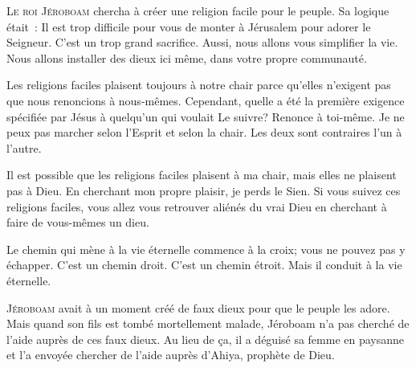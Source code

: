 \lettrine{L}{e roi Jéroboam} chercha à créer une religion facile
 pour le peuple. Sa logique était~:
 \og Il est trop difficile pour vous de monter à Jérusalem
 pour adorer le Seigneur. C'est un trop grand sacrifice.
 Aussi, nous allons vous simplifier la vie.
 Nous allons installer des dieux ici même,
 dans votre propre communauté. \fg{}

Les religions faciles plaisent toujours à notre chair
 parce qu'elles n'exigent pas que nous renoncions à nous-mêmes.
 Cependant, quelle a été la première exigence spécifiée par Jésus
 à quelqu'un qui voulait Le suivre?
 \og Renonce à toi-même. \fg{}
 Je ne peux pas marcher selon l'Esprit et selon la chair.
 Les deux sont contraires l'un à l'autre. 


Il est possible que les religions faciles plaisent à ma chair,
 mais elles ne plaisent pas à Dieu.
 En cherchant mon propre plaisir, je perds le Sien.
 Si vous suivez ces religions faciles, vous allez vous retrouver aliénés
 du vrai Dieu en cherchant à faire de vous-mêmes un dieu. 

Le chemin qui mène à la vie éternelle commence à la croix;
 vous ne pouvez pas y échapper.
 C'est un chemin droit. C'est un chemin étroit.
 Mais il conduit à la vie éternelle. 

\dvrule






\lettrine{J}{éroboam} avait à un moment créé de faux dieux
 pour que le peuple les adore.
 Mais quand son fils est tombé mortellement malade,
 Jéroboam n'a pas cherché de l'aide auprès de ces faux dieux.
 Au lieu de ça, il a déguisé sa femme en paysanne
 et l'a envoyée chercher de l'aide auprès d'Ahiya, prophète de Dieu.


